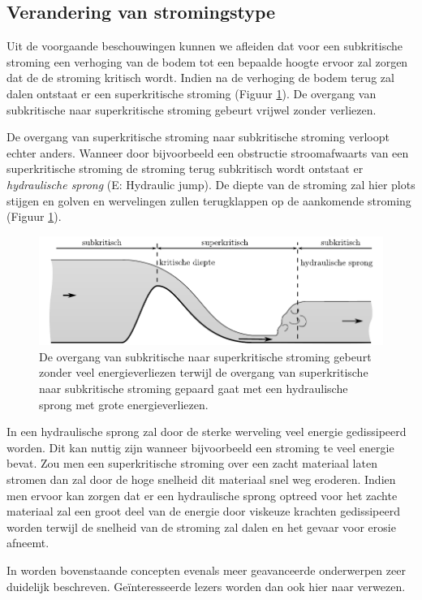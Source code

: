 	\subsection{Verandering van stromingstype}
Uit de voorgaande beschouwingen kunnen we afleiden dat voor een subkritische stroming een verhoging van de bodem tot een bepaalde hoogte ervoor zal zorgen dat de de stroming kritisch wordt. Indien na de verhoging de bodem terug zal dalen ontstaat er een superkritische stroming (Figuur \ref{fig:Open_kanaal_subkritisch_naar_superkritisch}). De overgang van subkritische naar superkritische stroming gebeurt vrijwel zonder verliezen.

De overgang van superkritische stroming naar subkritische stroming verloopt echter anders. Wanneer door bijvoorbeeld een obstructie stroomafwaarts van een superkritische stroming de stroming terug subkritisch wordt ontstaat er \emph{hydraulische sprong} (E: Hydraulic jump). De diepte van de stroming zal hier plots stijgen en golven en wervelingen zullen terugklappen op de aankomende stroming (Figuur \ref{fig:Open_kanaal_subkritisch_naar_superkritisch}). 
\begin{figure}[htb]
	\centering
	\includegraphics{fig/kanaalstroming/Open_kanaal_subkritisch_naar_superkritisch}
	\caption{De overgang van subkritische naar superkritische stroming gebeurt zonder veel energieverliezen terwijl de overgang van superkritische naar subkritische stroming gepaard gaat met een hydraulische sprong met grote energieverliezen.}
	\label{fig:Open_kanaal_subkritisch_naar_superkritisch}
\end{figure}

In een hydraulische sprong zal door de sterke werveling veel energie gedissipeerd worden. Dit kan nuttig zijn wanneer bijvoorbeeld een stroming te veel energie bevat. Zou men een superkritische stroming over een zacht materiaal laten stromen dan zal door de hoge snelheid dit materiaal snel weg eroderen. Indien men ervoor kan zorgen dat er een hydraulische sprong optreed voor het zachte materiaal zal een groot deel van de energie door viskeuze krachten gedissipeerd worden terwijl de snelheid van de stroming zal dalen en het gevaar voor erosie afneemt.
	
In \cite{Chaudhry2007} worden bovenstaande concepten evenals meer geavanceerde onderwerpen zeer duidelijk beschreven. Geïnteresseerde lezers worden dan ook hier naar verwezen.